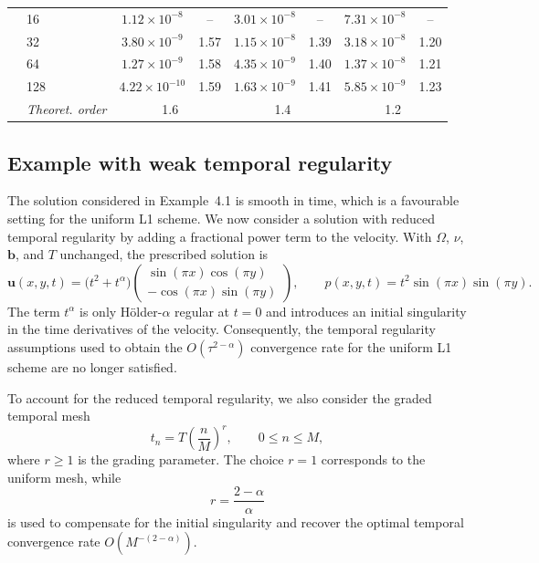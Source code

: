 \documentclass[11pt,a4paper]{article}
\numberwithin{equation}{section}
\theoremstyle{plain}
\theoremstyle{definition}
\theoremstyle{remark}
\begin{document}
\begin{table}[htbp]
\begin{tabular}{llcc|cc|cc}
\addlinespace
\multirow{5}{*}{Pressure}
& 16  & $1.12\times10^{-8}$  & --   & $3.01\times10^{-8}$ & --   & $7.31\times10^{-8}$ & --   \\
& 32  & $3.80\times10^{-9}$  & 1.57 & $1.15\times10^{-8}$ & 1.39 & $3.18\times10^{-8}$ & 1.20 \\
& 64  & $1.27\times10^{-9}$  & 1.58 & $4.35\times10^{-9}$ & 1.40 & $1.37\times10^{-8}$ & 1.21 \\
& 128 & $4.22\times10^{-10}$ & 1.59 & $1.63\times10^{-9}$ & 1.41 & $5.85\times10^{-9}$ & 1.23 \\
& \textit{Theoret. order}
& \multicolumn{2}{c|}{1.6}
& \multicolumn{2}{c|}{1.4}
& \multicolumn{2}{c}{1.2} \\

\bottomrule
\end{tabular}
\end{table}



\subsection{Example with weak temporal regularity}
\label{sec:example2}

The solution considered in Example~4.1 is smooth in time, which is a favourable setting for the uniform L1 scheme. We now consider a solution with reduced temporal regularity by adding a fractional power term to the velocity. With $\Omega$, $\nu$, $\boldsymbol{b}$, and $T$ unchanged, the prescribed solution is
\begin{equation}
\boldsymbol{u}(x,y,t)=\bigl(t^{2}+t^{\alpha}\bigr)
\begin{pmatrix}
\sin(\pi x)\cos(\pi y)\\[2pt]
-\cos(\pi x)\sin(\pi y)
\end{pmatrix},
\qquad
p(x,y,t)=t^{2}\sin(\pi x)\sin(\pi y).
\end{equation}
The term $t^\alpha$ is only H\"older-$\alpha$ regular at $t=0$ and introduces an initial singularity in the time derivatives of the velocity. Consequently, the temporal regularity assumptions used to obtain the $O(\tau^{2-\alpha})$ convergence rate for the uniform L1 scheme are no longer satisfied. 

To account for the reduced temporal regularity, we also consider the graded temporal mesh
\[
t_n=T\left(\frac{n}{M}\right)^r,\qquad 0\leq n\leq M,
\]
where $r\geq1$ is the grading parameter. The choice $r=1$ corresponds to the uniform mesh, while
\[
r=\frac{2-\alpha}{\alpha}
\]
is used to compensate for the initial singularity and recover the optimal temporal convergence rate $O(M^{-(2-\alpha)})$.
\end{document}
